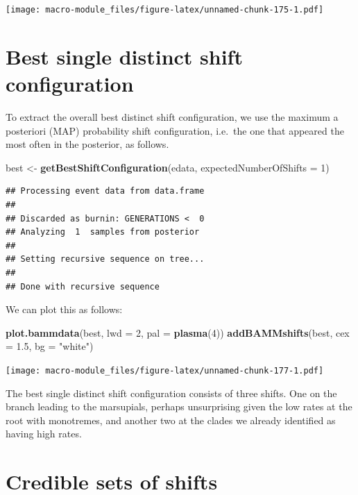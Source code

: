 \documentclass[]{book}
\newenvironment{Shaded}{\begin{snugshade}}{\end{snugshade}}
\newcommand{\KeywordTok}[1]{\textcolor[rgb]{0.13,0.29,0.53}{\textbf{{#1}}}}
\newcommand{\DataTypeTok}[1]{\textcolor[rgb]{0.13,0.29,0.53}{{#1}}}
\newcommand{\DecValTok}[1]{\textcolor[rgb]{0.00,0.00,0.81}{{#1}}}
\newcommand{\FloatTok}[1]{\textcolor[rgb]{0.00,0.00,0.81}{{#1}}}
\newcommand{\StringTok}[1]{\textcolor[rgb]{0.31,0.60,0.02}{{#1}}}
\newcommand{\NormalTok}[1]{{#1}}
\theoremstyle{definition}
\theoremstyle{definition}
\theoremstyle{definition}
\theoremstyle{remark}
\begin{document}
\texttt{[image: macro-module\_files/figure-latex/unnamed-chunk-175-1.pdf]}

\section{Best single distinct shift
configuration}\label{best-single-distinct-shift-configuration}

To extract the overall best distinct shift configuration, we use the
maximum a posteriori (MAP) probability shift configuration, i.e.~the one
that appeared the most often in the posterior, as follows.

\begin{Shaded}
\begin{Highlighting}[]
\NormalTok{best <-}\StringTok{ }\KeywordTok{getBestShiftConfiguration}\NormalTok{(edata, }\DataTypeTok{expectedNumberOfShifts =} \DecValTok{1}\NormalTok{)}
\end{Highlighting}
\end{Shaded}

\begin{verbatim}
## Processing event data from data.frame
## 
## Discarded as burnin: GENERATIONS <  0
## Analyzing  1  samples from posterior
## 
## Setting recursive sequence on tree...
## 
## Done with recursive sequence
\end{verbatim}

We can plot this as follows:

\begin{Shaded}
\begin{Highlighting}[]
\KeywordTok{plot.bammdata}\NormalTok{(best, }\DataTypeTok{lwd =} \DecValTok{2}\NormalTok{, }\DataTypeTok{pal =} \KeywordTok{plasma}\NormalTok{(}\DecValTok{4}\NormalTok{))}
\KeywordTok{addBAMMshifts}\NormalTok{(best, }\DataTypeTok{cex =} \FloatTok{1.5}\NormalTok{, }\DataTypeTok{bg =} \StringTok{"white"}\NormalTok{)}
\end{Highlighting}
\end{Shaded}

\texttt{[image: macro-module\_files/figure-latex/unnamed-chunk-177-1.pdf]}

The best single distinct shift configuration consists of three shifts.
One on the branch leading to the marsupials, perhaps unsurprising given
the low rates at the root with monotremes, and another two at the clades
we already identified as having high rates.

\section{Credible sets of shifts}\label{credible-sets-of-shifts}
\end{document}
